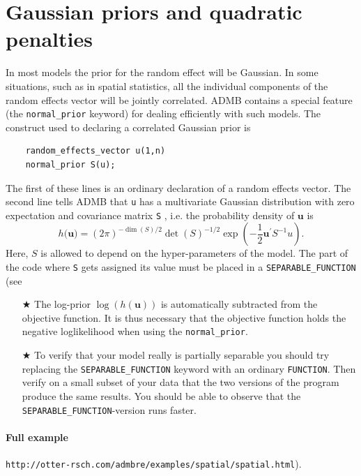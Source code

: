 \documentclass[12pt,letter,reqno]{book}
\begin{document}
\section{Gaussian priors and quadratic penalties\label{gaussianprior}}
In most models the
prior for the random effect will be Gaussian. In some situations,
such as in spatial statistics, all the individual components of the random effects vector will be jointly
correlated. ADMB contains a special feature (the \texttt{normal\_prior} keyword) for dealing efficiently with such
models. The construct used to declaring a correlated Gaussian prior is
\begin{lstlisting}
    random_effects_vector u(1,n)
    normal_prior S(u);
\end{lstlisting}
The first of these lines is an ordinary declaration of a random effects vector. The second line tells ADMB that
\texttt{u} has a multivariate Gaussian distribution with zero expectation and covariance matrix \texttt{S} ,
i.e. the probability density of $\mathbf{u}$ is
\[
h(\mathbf{u)=}\left( 2\pi \right) ^{-\dim(S)/2}\det (S)^{-1/2}\exp \left( - \frac{1}{2}\mathbf{u}^{\prime
}S^{-1}u\right) .
\]
Here, $S$ is allowed to depend on the hyper-parameters of the
model. The part of the code where \texttt{S} gets assigned its
value must be placed in a \texttt{SEPARABLE\_FUNCTION} (see

\begin{itemize}
\item[$\bigstar$] The log-prior $\log \left( h\left(
\mathbf{u}\right) \right) $ is automatically subtracted from the
objective function. It is thus necessary that the objective
function holds the negative loglikelihood when using the
\texttt{normal\_prior}.
\item[$\bigstar$] To verify that your
model really is partially separable you should try replacing the \texttt{SEPARABLE\_FUNCTION} keyword with an
ordinary \texttt{FUNCTION}. Then verify on a small subset of your data that the two versions of the program
produce the same results. You should be able to observe that the \texttt{SEPARABLE\_FUNCTION}-version runs
faster.
\end{itemize}
\paragraph{Full example}
\texttt{http://otter-rsch.com/admbre/examples/spatial/spatial.html}).


\appendix
\end{document}
